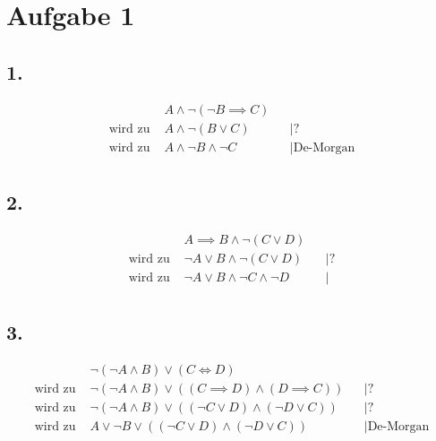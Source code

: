 \documentclass[a4paper,11pt]{article}
\begin{document}
\raggedright %

\section*{Aufgabe 1}
\subsection*{1.}
\begin{align*}
& A \land \neg (\neg B \implies C) & \\
\text{wird zu } & A \land \neg (B \lor C) && \big| \text{?} \\
\text{wird zu } & A \land \neg B \land \neg C && \big| \text{De-Morgan} \\
\end{align*}

\subsection*{2.}
\begin{align*}
& A \implies B \land \neg (C \lor D) & \\
\text{wird zu } & \neg A \lor B \land \neg (C \lor D) && \big| \text{?} \\
\text{wird zu } & \neg A \lor B \land \neg C \land \neg D && \big| \text{} \\
\end{align*}

\subsection*{3.}
\begin{align*}
& \neg(\neg A \land B) \lor (C \iff D) & \\
\text{wird zu } & \neg(\neg A \land B) \lor ((C \implies D) \land (D \implies C)) && \big| \text{?} \\
\text{wird zu } & \neg(\neg A \land B) \lor ((\neg C \lor D) \land (\neg D \lor C)) && \big| \text{?} \\
\text{wird zu } & A \lor \neg B \lor ((\neg C \lor D) \land (\neg D \lor C)) && \big| \text{De-Morgan} \\
\end{align*}
\end{document}
